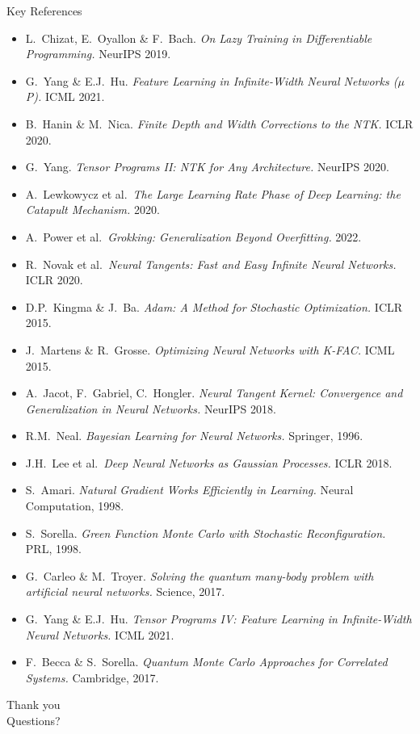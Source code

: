 \documentclass[aspectratio=169, 10pt]{beamer}
\begin{document}
\begin{frame}{Key References}
  \footnotesize
  \begin{itemize}
    \item L.\ Chizat, E.\ Oyallon \& F.\ Bach. \textit{On Lazy Training in Differentiable Programming.} NeurIPS 2019.
    \item G.\ Yang \& E.J.\ Hu. \textit{Feature Learning in Infinite-Width Neural Networks ($\mu$P).} ICML 2021.
    \item B.\ Hanin \& M.\ Nica. \textit{Finite Depth and Width Corrections to the NTK.} ICLR 2020.
    \item G.\ Yang. \textit{Tensor Programs II: NTK for Any Architecture.} NeurIPS 2020.
    \item A.\ Lewkowycz et al.\ \textit{The Large Learning Rate Phase of Deep Learning: the Catapult Mechanism.} 2020.
    \item A.\ Power et al.\ \textit{Grokking: Generalization Beyond Overfitting.} 2022.
    \item R.\ Novak et al.\ \textit{Neural Tangents: Fast and Easy Infinite Neural Networks.} ICLR 2020.
    \item D.P.\ Kingma \& J.\ Ba. \textit{Adam: A Method for Stochastic Optimization.} ICLR 2015.
    \item J.\ Martens \& R.\ Grosse. \textit{Optimizing Neural Networks with K-FAC.} ICML 2015.
    \item A.\ Jacot, F.\ Gabriel, C.\ Hongler. \textit{Neural Tangent Kernel: Convergence and Generalization in Neural Networks.} NeurIPS 2018.
    \item R.M.\ Neal. \textit{Bayesian Learning for Neural Networks.} Springer, 1996.
    \item J.H.\ Lee et al.\ \textit{Deep Neural Networks as Gaussian Processes.} ICLR 2018.
    \item S.\ Amari. \textit{Natural Gradient Works Efficiently in Learning.} Neural Computation, 1998.
    \item S.\ Sorella. \textit{Green Function Monte Carlo with Stochastic Reconfiguration.} PRL, 1998.
    \item G.\ Carleo \& M.\ Troyer. \textit{Solving the quantum many-body problem with artificial neural networks.} Science, 2017.
    \item G.\ Yang \& E.J.\ Hu. \textit{Tensor Programs IV: Feature Learning in Infinite-Width Neural Networks.} ICML 2021.
    \item F.\ Becca \& S.\ Sorella. \textit{Quantum Monte Carlo Approaches for Correlated Systems.} Cambridge, 2017.
  \end{itemize}
\end{frame}

\begin{frame}[plain]
  \begin{center}
    \Huge Thank you\\[1em]
    \large Questions?
  \end{center}
\end{frame}
\end{document}
